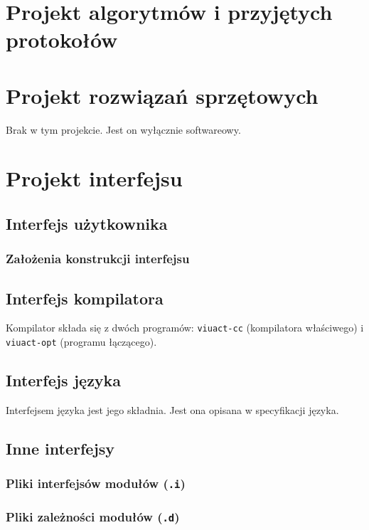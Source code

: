 \documentclass[11pt,oneside,a4paper,titlepage,onecolumn]{article}
\begin{document}
\section{Projekt algorytmów i przyjętych protokołów}

\section{Projekt rozwiązań sprzętowych}

Brak w tym projekcie. Jest on wyłącznie softwareowy.

\section{Projekt interfejsu}

\subsection{Interfejs użytkownika}

\subsubsection{Założenia konstrukcji interfejsu}

\subsection{Interfejs kompilatora}

Kompilator składa się z dwóch programów: \texttt{viuact-cc} (kompilatora właściwego) i \texttt{viuact-opt}
(programu łączącego).

\subsection{Interfejs języka}

Interfejsem języka jest jego składnia.
Jest ona opisana w specyfikacji języka.

\subsection{Inne interfejsy}

\subsubsection{Pliki interfejsów modułów (\texttt{.i})}
\label{pliki_interfejsow_modulow}

\subsubsection{Pliki zależności modułów (\texttt{.d})}
\label{pliki_zaleznosci_modulow}
\end{document}
